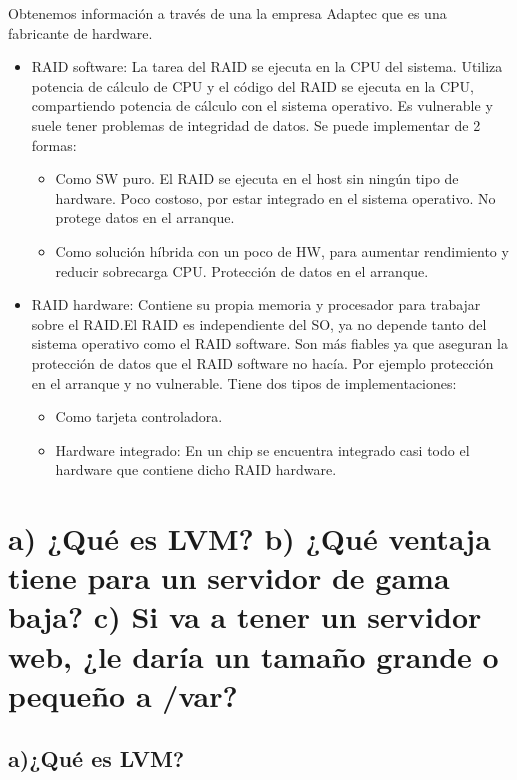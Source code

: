	Obtenemos información a través de una la empresa Adaptec\cite{quince} que es una fabricante de hardware.
	\begin{itemize}
		\item RAID software: La tarea del RAID se ejecuta en la CPU del sistema. Utiliza potencia de cálculo de CPU y el código del RAID se ejecuta en la CPU, compartiendo potencia de cálculo con el sistema operativo. Es vulnerable y suele tener problemas de integridad de datos.
		Se puede implementar de 2 formas:
		\begin{itemize}
			\item Como SW puro. El RAID se ejecuta en el host sin ningún tipo de hardware. Poco costoso, por estar integrado en el sistema operativo. No protege datos en el arranque. 
			\item Como solución híbrida con un poco de HW, para aumentar rendimiento y reducir sobrecarga CPU. Protección de datos en el arranque.
		\end{itemize}
		\item RAID hardware: Contiene su propia memoria y procesador para trabajar sobre el RAID.El RAID es independiente del SO, ya no depende tanto del sistema operativo como el RAID software. Son más fiables ya que aseguran la protección de datos que el RAID software no hacía. Por ejemplo protección en el arranque y no vulnerable.
		Tiene dos tipos de implementaciones:
		\begin{itemize}
			\item Como tarjeta controladora. 
			\item Hardware integrado: En un chip se encuentra integrado casi todo el hardware que contiene dicho RAID hardware.
		\end{itemize}
	\end{itemize}
	
	\section{a) ¿Qué es LVM?  b) ¿Qué ventaja tiene para un servidor de gama baja? c) Si va a tener un servidor web, ¿le daría un tamaño grande o pequeño a /var?}
	
	\subsection{a)¿Qué es LVM?}
	
